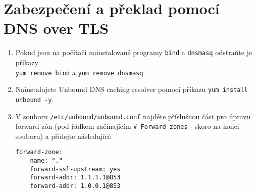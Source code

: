 \section{Zabezpečení a překlad pomocí DNS over TLS}
\label{sec:dot}
\begin{enumerate}
    \item Pokud jsou na počítači nainstalované programy \texttt{bind} a \texttt{dnsmasq} odstraňte je příkazy\\ \texttt{yum remove bind} a \texttt{yum remove dnsmasq}.
    \item Nainstalujete Unbound DNS caching resolver pomocí příkazu \texttt{yum install unbound -y}.
    \item V souboru \texttt{/etc/unbound/unbound.conf} najděte příslušnou část pro úpravu forward zón (pod řádkem začínajícím \texttt{\# Forward zones} - skoro na konci souboru) a přidejte následující:
    
\begin{verbatim}
forward-zone:
    name: "."
    forward-ssl-upstream: yes
    forward-addr: 1.1.1.1@853
    forward-addr: 1.0.0.1@853
\end{verbatim}


\end{enumerate}
